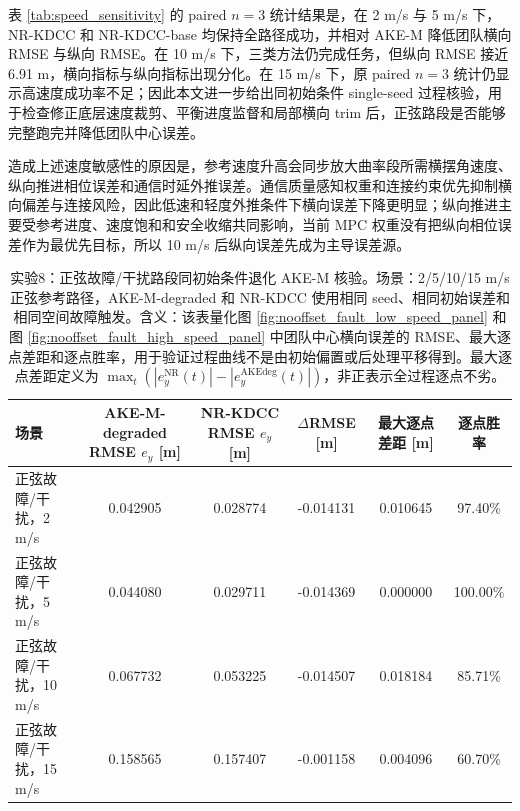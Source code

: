 \documentclass[twocolumn,3p,times,procedia]{elsarticle}
\newif\ifNRReview
\newcommand{\reviewblock}[1]{\ifNRReview\par\smallskip\noindent\begingroup\setlength{\fboxsep}{4pt}\colorbox{yellow!35}{\parbox{0.96\linewidth}{\footnotesize\textbf{当前不足：} #1}}\endgroup\par\smallskip\fi}
\newcommand{\AKE}{AKE-M}
\newcommand{\Method}{NR-KDCC}
\newcommand{\AKEdeg}{AKE-M-degraded}
\newcommand{\MethodBase}{NR-KDCC-base}
\begin{document}
表 \ref{tab:speed_sensitivity} 的 paired $n=3$ 统计结果是，在 2 m/s 与 5 m/s 下，\Method{} 和 \MethodBase{} 均保持全路径成功，并相对 \AKE{} 降低团队横向 RMSE 与纵向 RMSE。在 10 m/s 下，三类方法仍完成任务，但纵向 RMSE 接近 6.91 m，横向指标与纵向指标出现分化。在 15 m/s 下，原 paired $n=3$ 统计仍显示高速度成功率不足；因此本文进一步给出同初始条件 single-seed 过程核验，用于检查修正底层速度裁剪、平衡进度监督和局部横向 trim 后，正弦路段是否能够完整跑完并降低团队中心误差。

造成上述速度敏感性的原因是，参考速度升高会同步放大曲率段所需横摆角速度、纵向推进相位误差和通信时延外推误差。通信质量感知权重和连接约束优先抑制横向偏差与连接风险，因此低速和轻度外推条件下横向误差下降更明显；纵向推进主要受参考进度、速度饱和和安全收缩共同影响，当前 MPC 权重没有把纵向相位误差作为最优先目标，所以 10 m/s 后纵向误差先成为主导误差源。
\reviewblock{paired $n=3$ 速度扫频中的 15 m/s 仍未形成全路径统计闭合；最新同初始条件 single-seed 说明修复底层速度裁剪后可以跑完整，并可小幅降低横向/纵向 RMSE，但不能替代多 seed 成功率结论，也不能写作 15 m/s 全过程逐点优势。10 m/s 纵向 RMSE 已显著放大，因此速度扫频仍不能写成全速度全指标鲁棒。}

\begin{table}[!tbp]
\centering
\caption{实验8：正弦故障/干扰路段同初始条件退化 AKE-M 核验。场景：2/5/10/15 m/s 正弦参考路径，\AKEdeg{} 和 \Method{} 使用相同 seed、相同初始误差和相同空间故障触发。含义：该表量化图 \ref{fig:nooffset_fault_low_speed_panel} 和图 \ref{fig:nooffset_fault_high_speed_panel} 中团队中心横向误差的 RMSE、最大逐点差距和逐点胜率，用于验证过程曲线不是由初始偏置或后处理平移得到。最大逐点差距定义为 $\max_t(|e_y^{\mathrm{NR}}(t)|-|e_y^{\mathrm{AKEdeg}}(t)|)$，非正表示全过程逐点不劣。}
\label{tab:nooffset_degraded_sine}
\footnotesize
\begin{tabular}{p{}ccccc}
\toprule
场景 & \AKEdeg{} RMSE $e_y$ [m] & \Method{} RMSE $e_y$ [m] & $\Delta$RMSE [m] & 最大逐点差距 [m] & 逐点胜率\\
\midrule
正弦故障/干扰，2 m/s & 0.042905 & 0.028774 & -0.014131 & 0.010645 & 97.40\%\\
正弦故障/干扰，5 m/s & 0.044080 & 0.029711 & -0.014369 & 0.000000 & 100.00\%\\
正弦故障/干扰，10 m/s & 0.067732 & 0.053225 & -0.014507 & 0.018184 & 85.71\%\\
正弦故障/干扰，15 m/s & 0.158565 & 0.157407 & -0.001158 & 0.004096 & 60.70\%\\
\bottomrule
\end{tabular}
\end{table}
\end{document}
